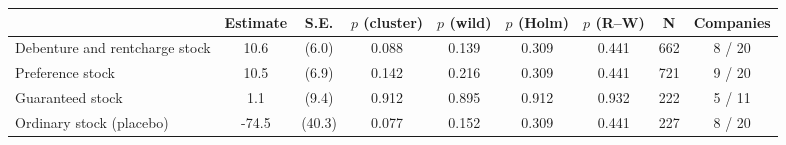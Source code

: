 \begin{tabular}{lcccccccc}
\toprule
 & Estimate & S.E. & $p$ (cluster) & $p$ (wild) & $p$ (Holm) & $p$ (R--W) & N & Companies \\
\midrule
Debenture and rentcharge stock & 10.6 & (6.0) & 0.088 & 0.139 & 0.309 & 0.441 & 662 & 8 / 20 \\
Preference stock & 10.5 & (6.9) & 0.142 & 0.216 & 0.309 & 0.441 & 721 & 9 / 20 \\
Guaranteed stock & 1.1 & (9.4) & 0.912 & 0.895 & 0.912 & 0.932 & 222 & 5 / 11 \\
Ordinary stock (placebo) & -74.5 & (40.3) & 0.077 & 0.152 & 0.309 & 0.441 & 227 & 8 / 20 \\
\bottomrule
\end{tabular}
